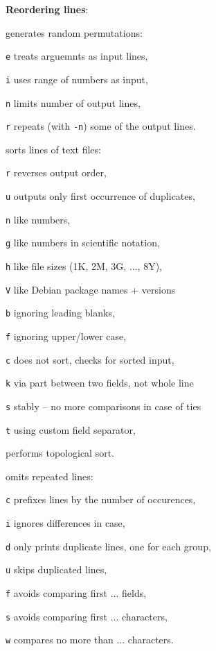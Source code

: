 \textbf{Reordering lines}:
\begin{compactenum}
	\item [\symbolcoreutils]  generates random permutations:
	\item [\texttt{e}] treats arguemnts as input lines,
	\item [\texttt{i}] uses range of numbers as input, 
	\item [\texttt{n}] limits number of output lines,
	\item [\texttt{r}] repeats (with \texttt{-n}) some of the output lines.

	\item [\symbolcoreutils]  sorts lines of text files:
	\item [\texttt{r}] reverses output order,
	\item [\texttt{u}] outputs only first occurrence of duplicates,
	\item [\texttt{n}] like numbers,
	\item [\texttt{g}] like numbers in scientific notation,
	\item [\texttt{h}] like file sizes (1K, 2M, 3G, ..., 8Y),
	\item [\texttt{V}] like Debian package names + versions
	\item [\texttt{b}] ignoring leading blanks,
	\item [\texttt{f}] ignoring upper/lower case,
	\item [\texttt{c}] does not sort, checks for sorted input,
	\item [\texttt{k}] via part between two fields, not whole line
	\item [\texttt{s}] stably -- no more comparisons in case of ties
	\item [\texttt{t}] using custom field separator,

	\item [\symbolcoreutils]  performs topological sort.

	\item [\symbolcoreutils]  omits repeated lines:
	\item [\texttt{c}] prefixes lines by the number of occurences,
	\item [\texttt{i}] ignores differences in case,
	\item [\texttt{d}] only prints duplicate lines, one for each group,
	\item [\texttt{u}] skips duplicated lines,
	\item [\texttt{f}] avoids comparing first ... fields,
	\item [\texttt{s}] avoids comparing first ... characters,
	\item [\texttt{w}] compares no more than ... characters.
\end{compactenum}

